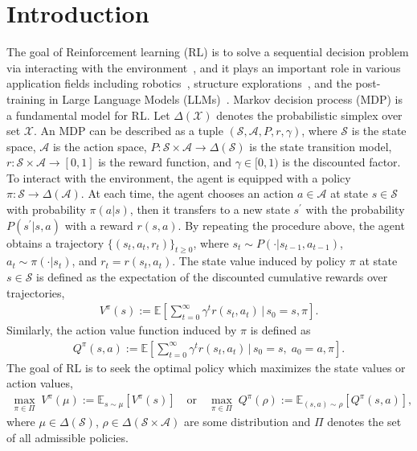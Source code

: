 \documentclass[10pt]{article}
\newcommand{\calA}{\mathcal{A}}
\newcommand{\calS}{\mathcal{S}}
\newcommand{\E}{\mathbb{E}}
\newcommand{\ls}{\left}
\newcommand{\rs}{\right}
\theoremstyle{plain}
\theoremstyle{definition}
\begin{document}
\section{Introduction}
The goal of {Reinforcement learning} (RL) is to solve  a sequential decision problem via interacting with the environment~\citep{suttonRL}, and it plays an important role in various application fields including robotics~\citep{robot1,robot2,robot3,LZ-robot}, structure explorations~\citep{ref-AlphaFold,ref-AlphaTensor}, and the post-training in Large Language Models (LLMs)~\citep{Zhang2025ASO}. {Markov decision process (MDP)} is a fundamental model for RL. Let $\Delta(\mathcal{X})$ denotes the probabilistic simplex over set $\mathcal{X}$. An MDP can be described as a tuple $(\calS, \calA, P, r, \gamma)$, where $\calS$ is the state space, $\calA$ is the action space, $P: \calS\times \calA \to \Delta(\calS)$ is the state transition model, $r: \calS \times \calA \to [0,1]$ is the reward function, and $\gamma \in [0,1)$ is the discounted factor. To interact with the environment, the agent is equipped with a policy $\pi: \calS \to \Delta(\calA)$. At each time, the agent chooses an action $a\in\calA$ at state $s\in\calS$ with probability $\pi(a|s)$, then it transfers to a new state $s^\prime$ with the probability $P(s^\prime|s,a)$ with a reward $r(s,a)$. By repeating the procedure above, the agent obtains a trajectory $\{ (s_t, a_t, r_t) \}_{t\geq 0}$, where $s_t\sim P(\cdot|s_{t-1},a_{t-1})$, $a_t\sim\pi(\cdot|s_t)$, and $r_t = r(s_t, a_t)$. The state value  induced by policy $\pi$ at  state $s\in\calS$ is defined as the expectation of the discounted cumulative rewards over trajectories,
\begin{align*}
    V^\pi(s) := {\E} \ls[ \sum_{t=0}^{\infty} \gamma^t r(s_t, a_t) \, \bigg | \, s_0=s,\pi \rs].
\end{align*}
 Similarly,  the action value function induced by $\pi$ is defined as
\begin{align*}
    Q^\pi(s,a) := {\E} \ls[ \sum_{t=0}^{\infty} \gamma^t r(s_t, a_t) \, \bigg | \, s_0=s, \; a_0 = a,\pi \rs].
\end{align*}
The goal of RL is to seek the optimal policy which maximizes the state values or action values, 
\begin{align}
    \max_{\pi \in \Pi} \; V^{\pi}(\mu) := \E_{s\sim\mu}[V^\pi(s)] \quad \mbox{or} \quad \max_{\pi\in\Pi} \; Q^\pi(\rho) := \E_{(s,a)\sim\rho} \ls[ Q^\pi(s,a) \rs],
    \label{eq:RL-goal}
\end{align}
where $\mu \in \Delta(\calS)$, $\rho \in \Delta(\calS\times\calA)$ are some distribution and $\Pi$ denotes the set of all admissible policies. 
\end{document}
